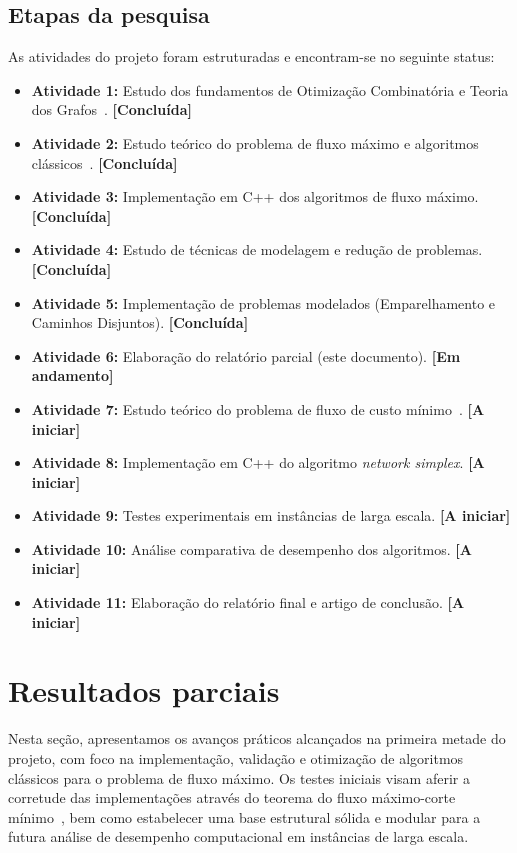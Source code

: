 \documentclass[12pt,a4paper]{article}
\begin{document}
\subsection{Etapas da pesquisa}
As atividades do projeto foram estruturadas e encontram-se no seguinte status:
\begin{itemize}
    \item \textbf{Atividade 1:} Estudo dos fundamentos de Otimização Combinatória e Teoria dos Grafos~\cite{cook1998combinatorial}. \textbf{[Concluída]}
    \item \textbf{Atividade 2:} Estudo teórico do problema de fluxo máximo e algoritmos clássicos~\cite{ford1956maximal, edmonds1972theoretical, dinic1970algorithm, goldberg1988new}. \textbf{[Concluída]}
    \item \textbf{Atividade 3:} Implementação em C++ dos algoritmos de fluxo máximo. \textbf{[Concluída]}
    \item \textbf{Atividade 4:} Estudo de técnicas de modelagem e redução de problemas. \textbf{[Concluída]}
    \item \textbf{Atividade 5:} Implementação de problemas modelados (Emparelhamento e Caminhos Disjuntos). \textbf{[Concluída]}
    \item \textbf{Atividade 6:} Elaboração do relatório parcial (este documento). \textbf{[Em andamento]}
    \item \textbf{Atividade 7:} Estudo teórico do problema de fluxo de custo mínimo~\cite{cook1998combinatorial}. \textbf{[A iniciar]}
    \item \textbf{Atividade 8:} Implementação em C++ do algoritmo \textit{network simplex}. \textbf{[A iniciar]}
    \item \textbf{Atividade 9:} Testes experimentais em instâncias de larga escala. \textbf{[A iniciar]}
    \item \textbf{Atividade 10:} Análise comparativa de desempenho dos algoritmos. \textbf{[A iniciar]}
    \item \textbf{Atividade 11:} Elaboração do relatório final e artigo de conclusão. \textbf{[A iniciar]}
\end{itemize}

\section{Resultados parciais}
Nesta seção, apresentamos os avanços práticos alcançados na primeira metade do projeto, com foco na implementação, validação e otimização de algoritmos clássicos para o problema de fluxo máximo. Os testes iniciais visam aferir a corretude das implementações através do teorema do fluxo máximo-corte mínimo~\cite{ford1956maximal}, bem como estabelecer uma base estrutural sólida e modular para a futura análise de desempenho computacional em instâncias de larga escala.
\end{document}
